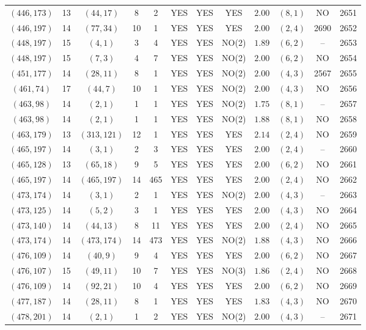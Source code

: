 \begin{longtable}{|c|c|c|c|c|c|c|c|c|c|c|c|}
$(446,173)$ & 13 & $(44,17)$ & 8 & 2 & YES & YES & YES & $2.00$ & $(8,1)$ & NO & 2651\\
$(446,197)$ & 14 & $(77,34)$ & 10 & 1 & YES & YES & YES & $2.00$ & $(2,4)$ & 2690 & 2652\\
$(448,197)$ & 15 & $(4,1)$ & 3 & 4 & YES & YES & NO(2) & $1.89$ & $(6,2)$ & -- & 2653\\
$(448,197)$ & 15 & $(7,3)$ & 4 & 7 & YES & YES & NO(2) & $2.00$ & $(6,2)$ & NO & 2654\\
$(451,177)$ & 14 & $(28,11)$ & 8 & 1 & YES & YES & NO(2) & $2.00$ & $(4,3)$ & 2567 & 2655\\
$(461,74)$ & 17 & $(44,7)$ & 10 & 1 & YES & YES & NO(2) & $2.00$ & $(4,3)$ & NO & 2656\\
$(463,98)$ & 14 & $(2,1)$ & 1 & 1 & YES & YES & NO(2) & $1.75$ & $(8,1)$ & -- & 2657\\
$(463,98)$ & 14 & $(2,1)$ & 1 & 1 & YES & YES & NO(2) & $1.88$ & $(8,1)$ & NO & 2658\\
$(463,179)$ & 13 & $(313,121)$ & 12 & 1 & YES & YES & YES & $2.14$ & $(2,4)$ & NO & 2659\\
$(465,197)$ & 14 & $(3,1)$ & 2 & 3 & YES & YES & YES & $2.00$ & $(2,4)$ & -- & 2660\\
$(465,128)$ & 13 & $(65,18)$ & 9 & 5 & YES & YES & YES & $2.00$ & $(6,2)$ & NO & 2661\\
$(465,197)$ & 14 & $(465,197)$ & 14 & 465 & YES & YES & YES & $2.00$ & $(2,4)$ & NO & 2662\\
$(473,174)$ & 14 & $(3,1)$ & 2 & 1 & YES & YES & NO(2) & $2.00$ & $(4,3)$ & -- & 2663\\
$(473,125)$ & 14 & $(5,2)$ & 3 & 1 & YES & YES & YES & $2.00$ & $(4,3)$ & NO & 2664\\
$(473,140)$ & 14 & $(44,13)$ & 8 & 11 & YES & YES & YES & $2.00$ & $(2,4)$ & NO & 2665\\
$(473,174)$ & 14 & $(473,174)$ & 14 & 473 & YES & YES & NO(2) & $1.88$ & $(4,3)$ & NO & 2666\\
$(476,109)$ & 14 & $(40,9)$ & 9 & 4 & YES & YES & YES & $2.00$ & $(6,2)$ & NO & 2667\\
$(476,107)$ & 15 & $(49,11)$ & 10 & 7 & YES & YES & NO(3) & $1.86$ & $(2,4)$ & NO & 2668\\
$(476,109)$ & 14 & $(92,21)$ & 10 & 4 & YES & YES & YES & $2.00$ & $(6,2)$ & NO & 2669\\
$(477,187)$ & 14 & $(28,11)$ & 8 & 1 & YES & YES & YES & $1.83$ & $(4,3)$ & NO & 2670\\
$(478,201)$ & 14 & $(2,1)$ & 1 & 2 & YES & YES & NO(2) & $2.00$ & $(4,3)$ & -- & 2671\\

\end{longtable}
